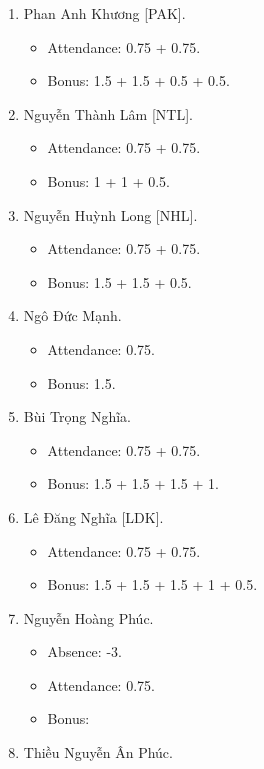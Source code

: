 \documentclass{article}
\begin{document}
\begin{enumerate}
    \item {\sc Phan Anh Khương [PAK].}
    \begin{itemize}
        \item Attendance: 0.75 + 0.75.
        \item Bonus: 1.5 + 1.5 + 0.5 + 0.5.
    \end{itemize}
    \item {\sc Nguyễn Thành Lâm [NTL].}
    \begin{itemize}
        \item Attendance: 0.75 + 0.75.
        \item Bonus: 1 + 1 + 0.5.
    \end{itemize}
    \item {\sc Nguyễn Huỳnh Long [NHL].}
    \begin{itemize}
        \item Attendance: 0.75 + 0.75.
        \item Bonus: 1.5 + 1.5 + 0.5.
    \end{itemize}
    \item {\sc Ngô Đức Mạnh.}
    \begin{itemize}
        \item Attendance: 0.75.
        \item Bonus: 1.5.
    \end{itemize}
    \item {\sc Bùi Trọng Nghĩa.}
    \begin{itemize}
        \item Attendance: 0.75 + 0.75.
        \item Bonus: 1.5 + 1.5 + 1.5 + 1.
    \end{itemize}
    \item {\sc Lê Đăng Nghĩa [LDK].}
    \begin{itemize}
        \item Attendance: 0.75 + 0.75.
        \item Bonus: 1.5 + 1.5 + 1.5 + 1 + 0.5.
    \end{itemize}
    \item {\sc Nguyễn Hoàng Phúc.}
    \begin{itemize}
        \item Absence: -3.
        \item Attendance: 0.75.
        \item Bonus:
    \end{itemize}
    \item {\sc Thiều Nguyễn Ân Phúc.}
    \begin{itemize}

\end{itemize}
\end{enumerate}
\end{document}
